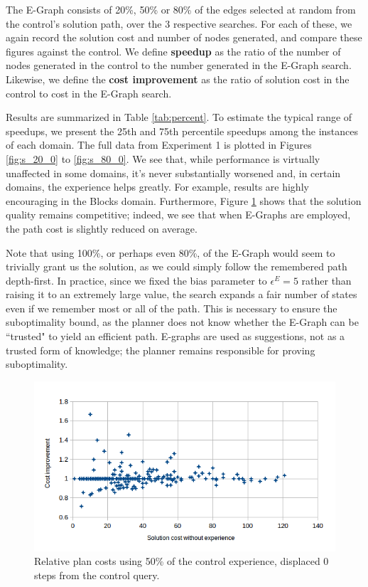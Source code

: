 \documentclass[letterpaper]{article}
\begin{document}
The E-Graph consists of 20\%, 50\% or 80\% of the edges selected at random from the control's solution path, over the 3 respective searches. For each of these, we again record the solution cost and number of nodes generated, and compare these figures against the control.
We define \textbf{speedup} as the ratio of the number of nodes generated in the control to the number generated in the E-Graph search.
Likewise, we define the \textbf{cost improvement} as the ratio of solution cost in the control to cost in the E-Graph search.

Results are summarized in Table \ref{tab:percent}.
To estimate the typical range of speedups, we present the 25th and 75th percentile speedups among the instances of each domain.
The full data from Experiment 1 is plotted in Figures \ref{fig:s_20_0} to \ref{fig:s_80_0}.
We see that, while performance is virtually unaffected in some domains, it's never substantially worsened and, in certain domains, the experience helps greatly.
For example, results are highly encouraging in the Blocks domain.
Furthermore, Figure \ref{fig:c_50_0} shows that the solution quality remains competitive; indeed, we see that when E-Graphs are employed, the path cost is slightly reduced on average.

Note that using 100\%, or perhaps even 80\%, of the E-Graph would seem to trivially grant us the solution, as we could simply follow the remembered path depth-first.
In practice, since we fixed the bias parameter to $\epsilon^E=5$ rather than raising it to an extremely large value, the search expands a fair number of states even if we remember most or all of the path.
This is necessary to ensure the suboptimality bound, as the planner does not know whether the E-Graph can be ``trusted" to yield an efficient path.
E-graphs are used as suggestions, not as a trusted form of knowledge; the planner remains responsible for proving suboptimality.

\begin{figure}
	\centering
	\includegraphics[scale=0.5]{Cost_50_0.png}
	\caption{Relative plan costs using 50\% of the control experience, displaced 0 steps from the control query.}
	 \label{fig:c_50_0}
\end{figure}
\end{document}
